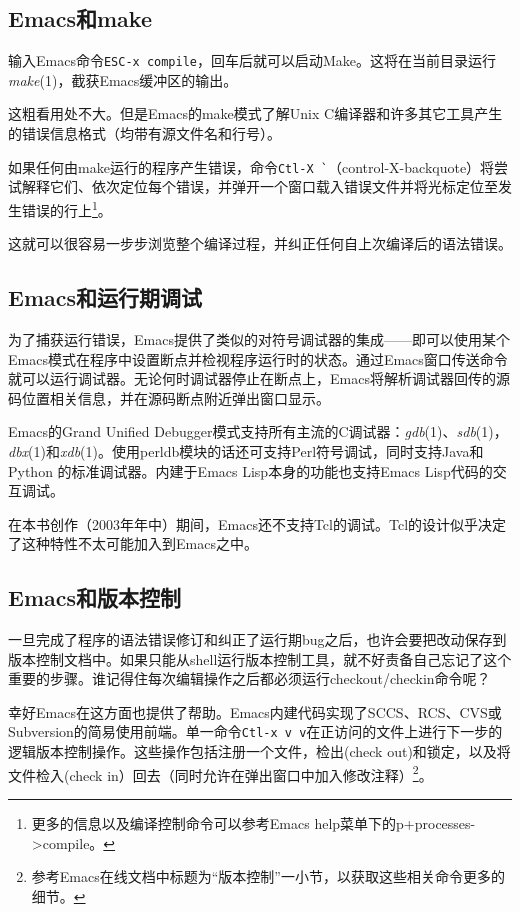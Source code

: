 \documentclass[12pt,oneside]{book}
\begin{document}
\begin{common-format}
\subsection{Emacs和make}
输入Emacs命令\verb+ESC-x compile+，回车后就可以启动Make。这将在当前目录运行\textit{make}(1)，截获Emacs缓冲区的输出。

这粗看用处不大。但是Emacs的make模式了解Unix C编译器和许多其它工具产生的错误信息格式（均带有源文件名和行号）。

如果任何由make运行的程序产生错误，命令\verb+Ctl-X `+（control-X-backquote）将尝试解释它们、依次定位每个错误，并弹开一个窗口载入错误文件并将光标定位至发生错误的行上\footnote{更多的信息以及编译控制命令可以参考Emacs help菜单下的p+processes->compile。}。

这就可以很容易一步步浏览整个编译过程，并纠正任何自上次编译后的语法错误。

\subsection{Emacs和运行期调试}
为了捕获运行错误，Emacs提供了类似的对符号调试器的集成——即可以使用某个Emacs模式在程序中设置断点并检视程序运行时的状态。通过Emacs窗口传送命令就可以运行调试器。无论何时调试器停止在断点上，Emacs将解析调试器回传的源码位置相关信息，并在源码断点附近弹出窗口显示。

Emacs的Grand Unified Debugger模式支持所有主流的C调试器：\textit{gdb}(1)、\textit{sdb}(1)，\textit{dbx}(1)和\textit{xdb}(1)。使用perldb模块的话还可支持Perl符号调试，同时支持Java和Python
的标准调试器。内建于Emacs Lisp本身的功能也支持Emacs Lisp代码的交互调试。

在本书创作（2003年年中）期间，Emacs还不支持Tcl的调试。Tcl的设计似乎决定了这种特性不太可能加入到Emacs之中。

\subsection{Emacs和版本控制}
一旦完成了程序的语法错误修订和纠正了运行期bug之后，也许会要把改动保存到版本控制文档中。如果只能从shell运行版本控制工具，就不好责备自己忘记了这个重要的步骤。谁记得住每次编辑操作之后都必须运行checkout/checkin命令呢？

幸好Emacs在这方面也提供了帮助。Emacs内建代码实现了SCCS、RCS、CVS或Subversion的简易使用前端。单一命令\verb+Ctl-x v v+在正访问的文件上进行下一步的逻辑版本控制操作。这些操作包括注册一个文件，检出(check out)和锁定，以及将文件检入(check in）回去（同时允许在弹出窗口中加入修改注释）\footnote{参考Emacs在线文档中标题为“版本控制”一小节，以获取这些相关命令更多的细节。}。


\end{common-format}
\end{document}
